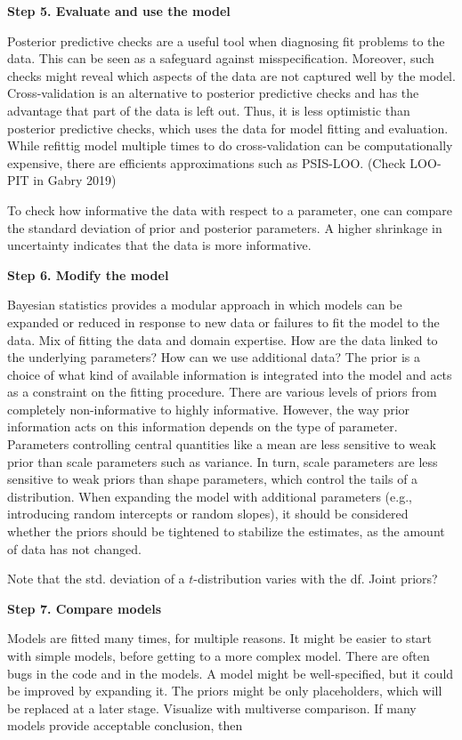 \textbf{Step 5. Evaluate and use the model}

Posterior predictive checks are a useful tool when diagnosing fit problems to the data.
This can be seen as a safeguard against misspecification.
Moreover, such checks might reveal which aspects of the data are not captured well by the model.
Cross-validation is an alternative to posterior predictive checks and has the advantage that part of the data is left out.
Thus, it is less optimistic than posterior predictive checks, which uses the data for model fitting and evaluation.
While refittig model multiple times to do cross-validation can be computationally expensive, there are efficients approximations such as PSIS-LOO.
(Check LOO-PIT in Gabry 2019)

To check how informative the data with respect to a parameter, one can compare the standard deviation of prior and posterior parameters. A higher shrinkage in uncertainty indicates that the data is more informative.

\textbf{Step 6. Modify the model}

Bayesian statistics provides a modular approach in which models can be expanded or reduced in response to new data or failures to fit the model to the data.
Mix of fitting the data and domain expertise.
How are the data linked to the underlying parameters?
How can we use additional data?
The prior is a choice of what kind of available information is integrated into the model and acts as a constraint on the fitting procedure.
There are various levels of priors from completely non-informative to highly informative.
However, the way prior information acts on this information depends on the type of parameter.
Parameters controlling central quantities like a mean are less sensitive to weak prior than scale parameters such as variance.
In turn, scale parameters are less sensitive to weak priors than shape parameters, which control the tails of a distribution.
When expanding the model with additional parameters (e.g., introducing random intercepts or random slopes), it should be considered whether the priors should be tightened to stabilize the estimates, as the amount of data has not changed.

Note that the std. deviation of a $t$-distribution varies with the df.
Joint priors?


\textbf{Step 7. Compare models}

Models are fitted many times, for multiple reasons.
It might be easier to start with simple models, before getting to a more complex model. There are often bugs in the code and in the models.
A model might be well-specified, but it could be improved by expanding it.
The priors might be only placeholders, which will be replaced at a later stage.
Visualize with multiverse comparison.
If many models provide acceptable conclusion, then

